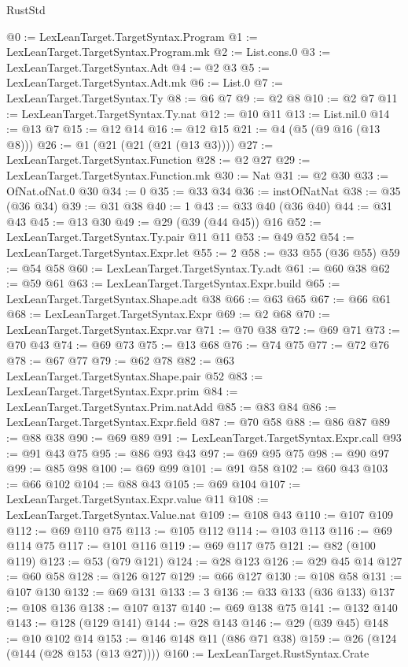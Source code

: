 \begin{lexlean}{RustStd}
\begin{coremodule}
@0 := LexLeanTarget.TargetSyntax.Program
@1 := LexLeanTarget.TargetSyntax.Program.mk
@2 := List.cons.{0}
@3 := LexLeanTarget.TargetSyntax.Adt
@4 := @2 @3
@5 := LexLeanTarget.TargetSyntax.Adt.mk
@6 := List.{0}
@7 := LexLeanTarget.TargetSyntax.Ty
@8 := @6 @7
@9 := @2 @8
@10 := @2 @7
@11 := LexLeanTarget.TargetSyntax.Ty.nat
@12 := @10 @11
@13 := List.nil.{0}
@14 := @13 @7
@15 := @12 @14
@16 := @12 @15
@21 := @4 (@5 (@9 @16 (@13 @8)))
@26 := @1 (@21 (@21 (@21 (@13 @3))))
@27 := LexLeanTarget.TargetSyntax.Function
@28 := @2 @27
@29 := LexLeanTarget.TargetSyntax.Function.mk
@30 := Nat
@31 := @2 @30
@33 := OfNat.ofNat.{0} @30
@34 := 0
@35 := @33 @34
@36 := instOfNatNat
@38 := @35 (@36 @34)
@39 := @31 @38
@40 := 1
@43 := @33 @40 (@36 @40)
@44 := @31 @43
@45 := @13 @30
@49 := @29 (@39 (@44 @45)) @16
@52 := LexLeanTarget.TargetSyntax.Ty.pair @11 @11
@53 := @49 @52
@54 := LexLeanTarget.TargetSyntax.Expr.let
@55 := 2
@58 := @33 @55 (@36 @55)
@59 := @54 @58
@60 := LexLeanTarget.TargetSyntax.Ty.adt
@61 := @60 @38
@62 := @59 @61
@63 := LexLeanTarget.TargetSyntax.Expr.build
@65 := LexLeanTarget.TargetSyntax.Shape.adt @38
@66 := @63 @65
@67 := @66 @61
@68 := LexLeanTarget.TargetSyntax.Expr
@69 := @2 @68
@70 := LexLeanTarget.TargetSyntax.Expr.var
@71 := @70 @38
@72 := @69 @71
@73 := @70 @43
@74 := @69 @73
@75 := @13 @68
@76 := @74 @75
@77 := @72 @76
@78 := @67 @77
@79 := @62 @78
@82 := @63 LexLeanTarget.TargetSyntax.Shape.pair @52
@83 := LexLeanTarget.TargetSyntax.Expr.prim
@84 := LexLeanTarget.TargetSyntax.Prim.natAdd
@85 := @83 @84
@86 := LexLeanTarget.TargetSyntax.Expr.field
@87 := @70 @58
@88 := @86 @87
@89 := @88 @38
@90 := @69 @89
@91 := LexLeanTarget.TargetSyntax.Expr.call
@93 := @91 @43 @75
@95 := @86 @93 @43
@97 := @69 @95 @75
@98 := @90 @97
@99 := @85 @98
@100 := @69 @99
@101 := @91 @58
@102 := @60 @43
@103 := @66 @102
@104 := @88 @43
@105 := @69 @104
@107 := LexLeanTarget.TargetSyntax.Expr.value @11
@108 := LexLeanTarget.TargetSyntax.Value.nat
@109 := @108 @43
@110 := @107 @109
@112 := @69 @110 @75
@113 := @105 @112
@114 := @103 @113
@116 := @69 @114 @75
@117 := @101 @116
@119 := @69 @117 @75
@121 := @82 (@100 @119)
@123 := @53 (@79 @121)
@124 := @28 @123
@126 := @29 @45 @14
@127 := @60 @58
@128 := @126 @127
@129 := @66 @127
@130 := @108 @58
@131 := @107 @130
@132 := @69 @131
@133 := 3
@136 := @33 @133 (@36 @133)
@137 := @108 @136
@138 := @107 @137
@140 := @69 @138 @75
@141 := @132 @140
@143 := @128 (@129 @141)
@144 := @28 @143
@146 := @29 (@39 @45)
@148 := @10 @102 @14
@153 := @146 @148 @11 (@86 @71 @38)
@159 := @26 (@124 (@144 (@28 @153 (@13 @27))))
@160 := LexLeanTarget.RustSyntax.Crate

\end{coremodule}
\end{lexlean}
